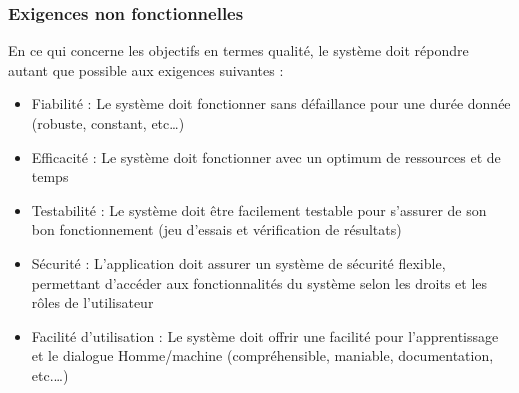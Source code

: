 \subsubsection{Exigences non fonctionnelles}

En ce qui concerne les objectifs en termes qualité, le système doit répondre autant que possible aux exigences suivantes : 
\begin{itemize}
\item Fiabilité : Le système doit fonctionner sans défaillance pour une durée donnée (robuste, constant, etc…)
\item Efficacité : Le système doit fonctionner avec un optimum de ressources et de temps
\item Testabilité : Le système doit être facilement testable pour s'assurer de son bon fonctionnement (jeu d'essais et vérification de résultats)
\item Sécurité : L’application  doit  assurer  un  système  de  sécurité  flexible,  permettant  d’accéder aux fonctionnalités du système selon les droits et les rôles de l'utilisateur
\item Facilité d’utilisation : Le système doit offrir une facilité pour l'apprentissage et le dialogue Homme/machine (compréhensible, maniable, documentation, etc.…)
\end{itemize}
